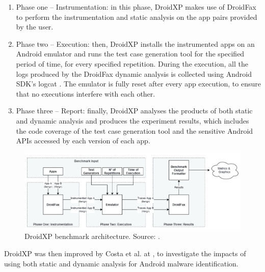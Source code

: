 \begin{enumerate}
    \item Phase one -- Instrumentation: in this phase, DroidXP makes use of DroidFax to perform the instrumentation and static analysis on the app pairs provided by the user.
    \item Phase two -- Execution: then, DroidXP installs the instrumented apps on an Android emulator and runs the test case generation tool for the specified period of time, for every specified repetition. During the execution, all the logs produced by the DroidFax dynamic analysis is collected using Android SDK's logcat \cite{noauthor_logcat_2023}. The emulator is fully reset after every app execution, to ensure that no executions interfere with each other.
    \item Phase three -- Report: finally, DroidXP analyses the products of both static and dynamic analysis and produces the experiment results, which includes the code coverage of the test case generation tool and the sensitive Android APIs accessed by each version of each app.
\end{enumerate}

\begin{figure}
    \centering
    \includegraphics[width=\textwidth]{img/droidxp.png}
    \caption{DroidXP benchmark architecture. Source: \cite{costa_droidxp_2020}.}
    \label{fig:droidxp-arch}
\end{figure}

DroidXP was then improved by Costa et al. at \cite{costa_exploring_2022}, to investigate the impacts of using both static and dynamic analysis for Android malware identification.